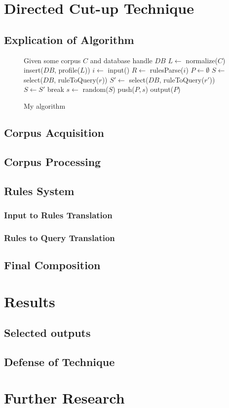 \documentclass[10pt]{article}
\begin{document}
\section{Directed Cut-up Technique}
\subsection{Explication of Algorithm}
\pagebreak
\onehalfspacing
\begin{figure}[here]
\begin{algorithmic}
\STATE Given some corpus $C$ and database handle $DB$
\STATE $L\gets$ normalize($C$)
\STATE insert($DB$, profile($L$))
\STATE $i \gets$ input()
\STATE $R \gets$ rulesParse($i$)
\STATE $P \gets \emptyset$
    \STATE $S \gets$ select($DB$, ruleToQuery($r$))
            \STATE $S\prime \gets$ select($DB$, ruleToQuery($r\prime$))
                \STATE $S \gets S\prime$
                \STATE break
            \ENDIF
        \ENDWHILE
    \ENDIF
    \STATE $s \gets$ random($S$)
    \STATE push($P, s$)
\ENDFOR
\STATE output($P$)
\end{algorithmic}
\caption{My algorithm}
\label{fig:algorithm}
\end{figure}
\doublespacing
\subsection{Corpus Acquisition}
\subsection{Corpus Processing}
\subsection{Rules System}
\subsubsection{Input to Rules Translation}
\subsubsection{Rules to Query Translation}
\subsection{Final Composition}
\section{Results}
\subsection{Selected outputs}
\subsection{Defense of Technique}
\section{Further Research}



\end{document}
